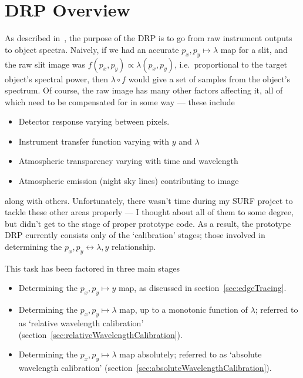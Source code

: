 \section{DRP Overview}

As described in~\cite{surfreport}, the purpose of the DRP is to go
from raw instrument outputs to object spectra. Naively, if we had an
accurate $p_x, p_y \mapsto \lambda$ map for a slit, and the raw slit
image was $f(p_x, p_y) \propto \lambda(p_x, p_y)$, i.e.\ proportional to the target
object's spectral power, then $\lambda \circ f$ would give a set of
samples from the object's spectrum. Of course, the raw image has many
other factors affecting it, all of which need to be compensated for in
some way --- these include
%
\begin{itemize}
\item Detector response varying between pixels.
\item Instrument transfer function varying with $y$ and $\lambda$
\item Atmospheric transparency varying with time and wavelength
\item Atmospheric emission (night sky lines) contributing to image
\end{itemize}
%
along with others. Unfortunately, there wasn't time during my SURF project
to tackle these other areas properly --- I thought about all of them to some degree,
but didn't get to the stage of proper prototype code. As a result, the prototype
DRP currently consists only of the `calibration' stages; those involved in
determining the $p_x, p_y \leftrightarrow \lambda, y$ relationship.

This task has been factored in three main stages
\begin{itemize}
\item Determining the $p_x, p_y \mapsto y$ map, as discussed in
section~\ref{sec:edgeTracing}.
\item Determining the $p_x, p_y \mapsto \lambda$ map, up to a monotonic
function of $\lambda$; referred to as `relative wavelength calibration'
(section~\ref{sec:relativeWavelengthCalibration}).
\item Determining the $p_x, p_y \mapsto \lambda$ map absolutely;
referred to as `absolute wavelength calibration' (section~\ref{sec:absoluteWavelengthCalibration}).
\end{itemize}
